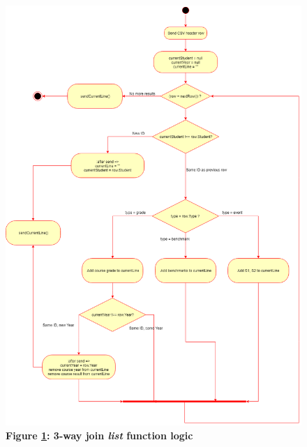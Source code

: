\begin{figure}[H]
    \centering
    \begin{mdframed}
        \centering
        \includegraphics[scale=0.4]{./resources/figures/3-way-join-list.png}
    \end{mdframed}
    \caption[3-Way Join List Function]{\textbf{Figure \ref{fig-3-way-join-list-function}: 3-way join \textit{list} function logic}}
    \label{fig-3-way-join-list-function}
\end{figure}
